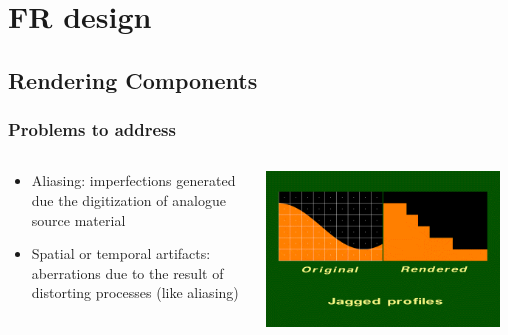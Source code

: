 \documentclass{beamer}
\begin{document}
\section[Foveated Renderer Design]{FR design}

\subsection{Rendering Components}

\begin{frame}
  \frametitle{Problems to address}
	\begin{columns}
	\begin{column}{0.4\textwidth}
	\begin{itemize}
  		\item Aliasing: imperfections generated due the digitization of analogue source material
		\item Spatial or temporal artifacts: aberrations due to the result of distorting processes (like aliasing)
	\end{itemize}
	\end{column}
	\begin{column}{0.6\textwidth}
		\includegraphics[width=0.95\textwidth]{Illustrations/aliasing.png}
  	\end{column}
  	\end{columns}
\end{frame}
\end{document}
